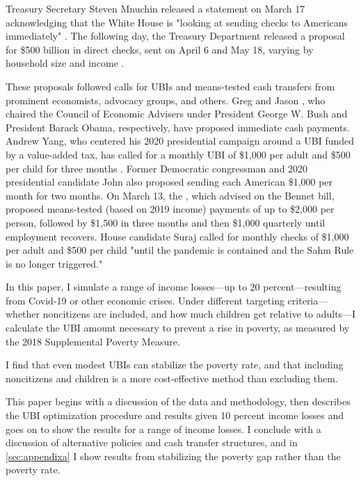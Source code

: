 \documentclass[12pt]{article}
\begin{document}
Treasury Secretary Steven Mnuchin released a statement on March 17 acknowledging that the White House is "looking at sending checks to Americans immediately" \cite{matthews_2020}. The following day, the Treasury Department released a proposal for \$500 billion in direct checks, sent on April 6 and May 18, varying by household size and income \cite{nyt_500b}.

These proposals followed calls for UBIs and means-tested cash transfers from prominent economists, advocacy groups, and others. Greg  and Jason , who chaired the Council of Economic Advisers under President George W. Bush and President Barack Obama, respectively, have proposed immediate cash payments. Andrew Yang, who centered his 2020 presidential campaign around a UBI funded by a value-added tax, has called for a monthly UBI of \$1,000 per adult and \$500 per child for three months \cite{kroll_2020}.
Former Democratic congressman and 2020 presidential candidate John  also proposed sending each American \$1,000 per month for two months. On March 13, the  , which advised on the Bennet bill, proposed means-tested (based on 2019 income) payments of up to \$2,000 per person, followed by \$1,500 in three months and then \$1,000 quarterly until employment recovers. House candidate Suraj  called for monthly checks of \$1,000 per adult and \$500 per child "until the pandemic is contained and the Sahm Rule is no longer triggered."

In this paper, I simulate a range of income losses---up to 20 percent---resulting from Covid-19 or other economic crises. Under different targeting criteria---whether noncitizens are included, and how much children get relative to adults---I calculate the UBI amount necessary to prevent a rise in poverty, as measured by the 2018 Supplemental Poverty Measure.

I find that even modest UBIs can stabilize the poverty rate, and that including noncitizens and children is a more cost-effective method than excluding them.

This paper begins with a discussion of the data and methodology, then describes the UBI optimization procedure and results given 10 percent income losses and goes on to show the results for a range of income losses. I conclude with a discussion of alternative policies and cash transfer structures, and in \autoref{sec:appendixa} I show results from stabilizing the poverty gap rather than the poverty rate.
\end{document}
